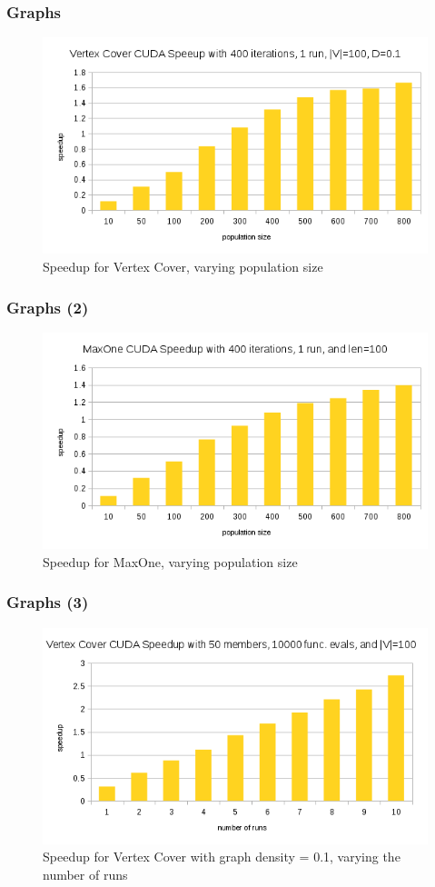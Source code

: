 \documentclass{beamer}
\begin{document}
	\begin{frame}
		\frametitle{Graphs}
		\begin{figure}[t]
  			\centering
  			\includegraphics[width=.9\textwidth]{vc_change_pop.png}
  			\caption{Speedup for Vertex Cover, varying population size}
		\end{figure}
	\end{frame}
	\begin{frame}
		\frametitle{Graphs (2)}
		\begin{figure}[t]
  			\centering
  			\includegraphics[width=.9\textwidth]{maxone_change_pop.png}
  			\caption{Speedup for MaxOne, varying population size}
		\end{figure}
	\end{frame}
	\begin{frame}
		\frametitle{Graphs (3)}
		\begin{figure}[t]
  			\centering
  			\includegraphics[width=.9\textwidth]{vc_change_runs.png}
  			\caption{Speedup for Vertex Cover with graph density = 0.1, varying the number of runs}
		\end{figure}
	\end{frame}
\end{document}
